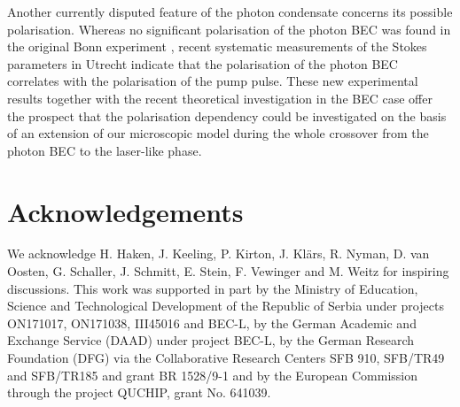 \documentclass[12pt, a4paper]{iopart}
\begin{document}
Another currently disputed feature of the photon condensate concerns its possible polarisation. Whereas no significant polarisation of the photon BEC was found in the original Bonn experiment \cite{Klaers_BEC_of_photons}, recent systematic measurements of the Stokes parameters in Utrecht \cite{NewOosten_2} indicate that the polarisation of the photon BEC correlates with the polarisation of the pump pulse. These new experimental results together with the recent theoretical investigation in the BEC case \cite{Keeling-Polarization} offer the prospect that the polarisation dependency could be investigated on the basis of an extension of our microscopic model during the whole crossover from the photon BEC to the laser-like phase.

\section*{Acknowledgements}

We acknowledge H. Haken, J. Keeling, P. Kirton, J. Kl\"ars, R. Nyman, D. van Oosten, G. Schaller, J. Schmitt, E. Stein, F. Vewinger and M. Weitz for inspiring discussions.
This work was supported in part by the Ministry of Education, Science and Technological Development of the Republic of Serbia under projects ON171017, ON171038, III45016 and BEC-L, by the German Academic and Exchange Service (DAAD) under project BEC-L, by the German Research Foundation (DFG) via the Collaborative Research Centers SFB 910, SFB/TR49 and SFB/TR185 and grant BR 1528/9-1 and by the European Commission through the project QUCHIP, grant No. 641039.
\end{document}
